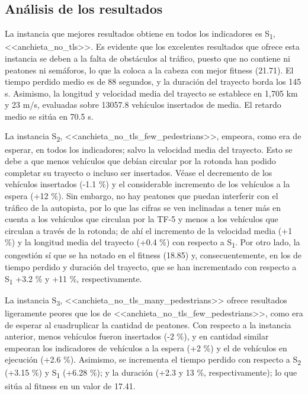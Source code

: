 \subsection{Análisis de los resultados}

La instancia que mejores resultados obtiene en todos los indicadores es S\textsubscript{1}, <<anchieta\_no\_tls>>. Es evidente que los excelentes resultados que ofrece esta instancia se deben a la falta de obstáculos al tráfico, puesto que no contiene ni peatones ni semáforos, lo que la coloca a la cabeza con mejor fitness (21.71). El tiempo perdido medio es de 88 segundos, y la duración del trayecto borda los 145 s. Asimismo, la longitud y velocidad media del trayecto se establece en 1,705 km y 23 m/s, evaluadas sobre 13057.8 vehículos insertados de media. El retardo medio se sitúa en 70.5 s.

La instancia S\textsubscript{2}, <<anchieta\_no\_tls\_few\_pedestrians>>, empeora, como era de esperar, en todos los indicadores; salvo la velocidad media del trayecto. Esto se debe a que menos vehículos que debían circular por la rotonda han podido completar su trayecto o incluso ser insertados. Véase el decremento de los vehículos insertados (-1.1 \%) y el considerable incremento de los vehículos a la espera (+12 \%). Sin embargo, no hay peatones que puedan interferir con el tráfico de la autopista, por lo que las cifras se ven inclinadas a tener más en cuenta a los vehículos que circulan por la TF-5 y menos a los vehículos que circulan a través de la rotonda; de ahí el incremento de la velocidad media (+1 \%) y la longitud media del trayecto (+0.4 \%) con respecto a S\textsubscript{1}. Por otro lado, la congestión sí que se ha notado en el fitness (18.85) y, consecuentemente, en los de tiempo perdido y duración del trayecto, que se han incrementado con respecto a S\textsubscript{1} +3.2 \% y +11 \%, respectivamente.

La instancia S\textsubscript{3}, <<anchieta\_no\_tls\_many\_pedestrians>> ofrece resultados ligeramente peores que los de <<anchieta\_no\_tls\_few\_pedestrians>>, como era de esperar al cuadruplicar la cantidad de peatones. Con respecto a la instancia anterior, menos vehículos fueron insertados (-2 \%), y en cantidad similar empeoran los indicadores de vehículos a la espera (+2 \%) y el de vehículos en ejecución (+2.6 \%). Asimismo, se incrementa el tiempo perdido con respecto a S\textsubscript{2} (+3.15 \%) y S\textsubscript{1} (+6.28 \%); y la duración (+2.3 y 13 \%, respectivamente); lo que sitúa al fitness en un valor de 17.41.

